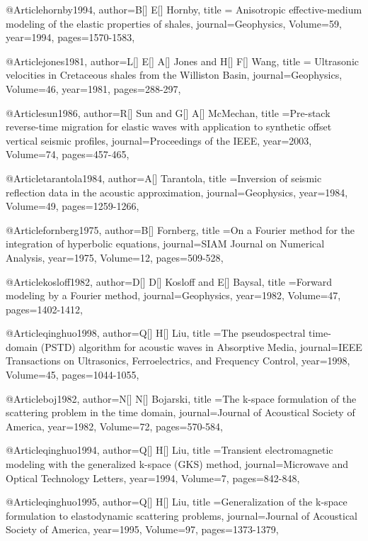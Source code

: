 @Article{hornby1994,
  author={B[] E[] Hornby},
  title = {Anisotropic effective-medium modeling of the elastic properties of shales},
  journal={Geophysics},
  Volume=59,
  year=1994,
  pages={1570-1583},
}

@Article{jones1981,
  author={L[] E[] A[] Jones and H[] F[] Wang},
  title = {Ultrasonic velocities in Cretaceous shales from the Williston Basin},
  journal={Geophysics},
  Volume=46,
  year=1981,
  pages={288-297},
}


@Article{sun1986,
  author={R[] Sun and G[] A[] McMechan},
  title ={Pre-stack reverse-time migration for elastic waves with application to synthetic offset vertical seismic profiles},
  journal={Proceedings of the IEEE},
  year=2003,
  Volume=74,
  pages={457-465},
}

@Article{tarantola1984,
  author={A[] Tarantola},
  title ={Inversion of seismic reflection data in the acoustic approximation},
  journal={Geophysics},
  year=1984,
  Volume=49,
  pages={1259-1266},
}

@Article{fornberg1975,
  author={B[] Fornberg},
  title ={On a {F}ourier method for the integration of hyperbolic equations},
  journal={SIAM Journal on Numerical Analysis},
  year=1975,
  Volume=12,
  pages={509-528},
}

@Article{kosloff1982,
  author={D[] D[] Kosloff and E[] Baysal},
  title ={Forward modeling by a {F}ourier method},
  journal={Geophysics},
  year=1982,
  Volume=47,
  pages={1402-1412},
}

@Article{qinghuo1998,
  author={Q[] H[] Liu},
  title ={The pseudospectral time-domain (PSTD) algorithm for acoustic waves in Absorptive Media},
  journal={IEEE Transactions on Ultrasonics, Ferroelectrics, and Frequency Control},
  year=1998,
  Volume=45,
  pages={1044-1055},
}

@Article{boj1982,
  author={N[] N[] Bojarski},
  title ={The k-space formulation of the scattering problem in the time domain},
  journal={Journal of Acoustical Society of America},
  year=1982,
  Volume=72,
  pages={570-584},
}


@Article{qinghuo1994,
  author={Q[] H[] Liu},
  title ={Transient electromagnetic modeling with the generalized k-space (GKS) method},
  journal={Microwave and Optical Technology Letters},
  year=1994,
  Volume=7,
  pages={842-848},
}

@Article{qinghuo1995,
  author={Q[] H[] Liu},
  title ={Generalization of the k-space formulation to elastodynamic scattering problems},
  journal={Journal of Acoustical Society of America},
  year=1995,
  Volume=97,
  pages={1373-1379},
}

